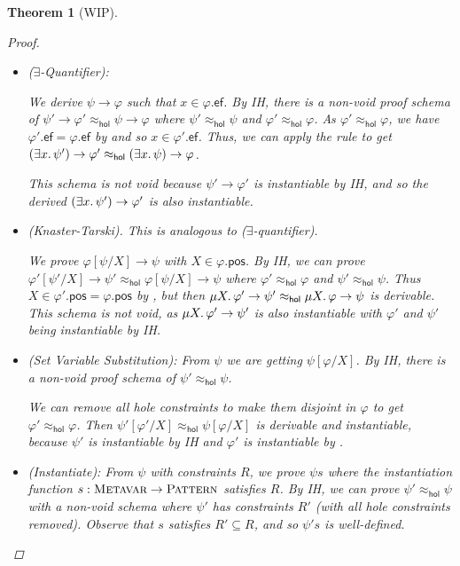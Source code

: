 \documentclass{article}
\numberwithin{deff}{section}
\numberwithin{lemma*}{section}
\newtheorem{theorem*}{Theorem}
\newcommand{\Pat}{\textsc{Pattern}}
\newcommand{\Metavar}{\textsc{Metavar}}
\newcommand{\Ef}{\mathsf{ef}}
\newcommand{\Pos}{\mathsf{pos}}
\newcommand{\Hol}{\mathsf{hol}}
\begin{document}
\begin{theorem*}[WIP]
\begin{proof}
\begin{itemize}
      Also $\varphi'$ is instantiable simply because $\psi'' \to \varphi'$ is instantiable by IH.
      This means that the resulting schema is not void.

      \item ($\exists$-Quantifier):

      We derive $\psi \to \varphi$ such that $x \in \varphi.\Ef$.
      By IH, there is a non-void proof schema of $\psi' \to \varphi' \approx_\Hol \psi \to \varphi$ where  $\psi' \approx_\Hol \psi$ and $\varphi' \approx_\Hol \varphi$. As $\varphi' \approx_\Hol \varphi$, we have $\varphi'.\Ef = \varphi.\Ef$ by  and so $x \in \varphi'.\Ef$.
      Thus, we can apply the rule to get $(\exists x \ldotp \psi') \to \varphi' \approx_\Hol (\exists x \ldotp \psi) \to \varphi$.

      This schema is not void because $\psi' \to \varphi'$ is instantiable by IH, and so the derived $(\exists x \ldotp \psi') \to \varphi'$ is also instantiable.

      \item (Knaster-Tarski).
      This is analogous to ($\exists$-quantifier).

      We prove $\varphi[\psi/X] \to \psi$ with $X \in \varphi.\Pos$.
      By IH, we can prove $\varphi'[\psi'/X] \to \psi' \approx_\Hol \varphi[\psi/X] \to \psi$ where $\varphi' \approx_\Hol \varphi$ and $\psi' \approx_\Hol \psi$.
      Thus $X \in \varphi'.\Pos = \varphi.\Pos$ by , but then $\mu X \ldotp \varphi' \to \psi' \approx_\Hol \mu X \ldotp \varphi \to \psi$ is derivable.
      This schema is not void, as $\mu X \ldotp \varphi' \to \psi'$ is also instantiable with $\varphi'$ and $\psi'$ being instantiable by IH.

      \item (Set Variable Substitution):
      From $\psi$ we are getting $\psi[\varphi/X]$.
      By IH, there is a non-void proof schema of $\psi' \approx_\Hol \psi$.

      We can remove all hole constraints to make them disjoint in $\varphi$ to get $\varphi' \approx_\Hol \varphi$.
      Then $\psi'[\varphi'/X] \approx_\Hol \psi[\varphi/X]$ is derivable and instantiable, because $\psi'$ is instantiable by IH and $\varphi'$ is  instantiable by .

      \item (Instantiate): From $\psi$ with constraints $R$, we prove $\psi s$ where the instantiation function $s : \Metavar \to \Pat$ satisfies $R$.
      By IH, we can prove $\psi' \approx_\Hol \psi$ with a non-void schema where $\psi'$ has constraints $R'$ (with all hole constraints removed).
      Observe that $s$ satisfies $R' \subseteq R$, and so $\psi' s$ is well-defined.


\end{itemize}
\end{proof}
\end{theorem*}
\end{document}
